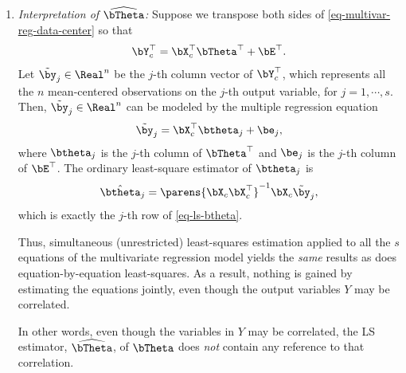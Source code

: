 \documentclass[12pt]{article}
\begin{document}
\begin{enumerate}[label=\textbf{\arabic*.}]
\begin{enumerate}
		\item \textit{Interpretation of $\widehat{\bTheta}$:}  Suppose we transpose both sides of \eqref{eq-multivar-reg-data-center} so that 
		\begin{align*}
			\bY_c^{\top} = \bX_c^\top \bTheta^\top + \bE^\top. 
		\end{align*}
		Let $\tilde{\by}_j \in \Real^n$ be the $j$-th column vector of $\bY_c^\top$, which represents all the $n$ mean-centered observations on the $j$-th output variable, for $j = 1, \cdots, s$. Then, $\tilde{\by}_j \in \Real^n$ can be modeled by the multiple regression equation 
		\begin{align*}
			\tilde{\by}_j = \bX_c^\top \btheta_j + \be_j, 
		\end{align*}
		where $\btheta_j$ is the $j$-th column of $\bTheta^\top$ and $\be_j$ is the $j$-th column of $\bE^\top$. The ordinary least-square estimator of $\btheta_j$ is 
		\begin{align*}
			\hat{\btheta}_j = \parens{\bX_c \bX_c^\top}^{-1} \bX_c \tilde{\by}_j, 
		\end{align*}
		which is exactly the $j$-th row of \eqref{eq-ls-btheta}. 
		
		Thus, simultaneous (unrestricted) least-squares estimation applied to all the $s$ equations of the multivariate regression model yields the \emph{same} results as does equation-by-equation least-squares. As a result, nothing is gained by estimating the equations jointly, even though the output variables $Y$ may be correlated. 
		
		In other words, even though the variables in $Y$ may be correlated, the LS estimator, $\widehat{\bTheta}$, of $\bTheta$ does \emph{not} contain any reference to that correlation. 
		

\end{enumerate}
\end{enumerate}
\end{document}
